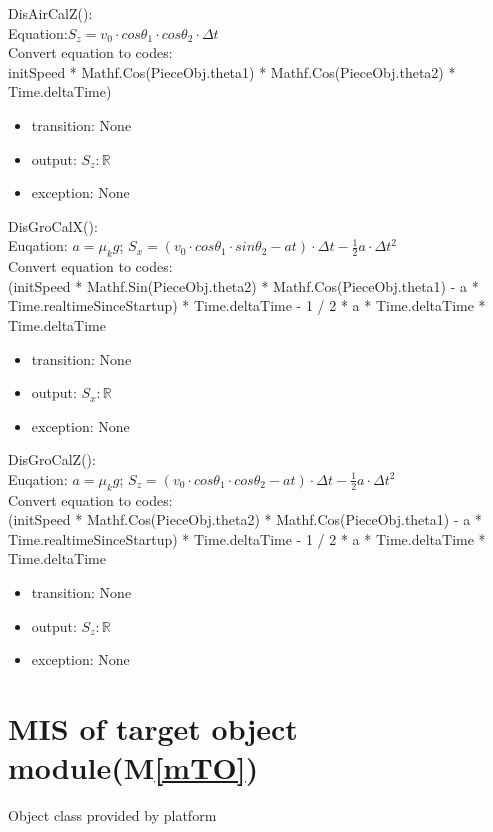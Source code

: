 \documentclass[12pt, titlepage]{article}
\newcommand{\mref}[1]{M\ref{#1}}
\begin{document}
\noindent DisAirCalZ():\\
Equation:$S_{z}=v_{0}\cdot cos\theta _{1}\cdot cos\theta _{2}\cdot \Delta t$\\
Convert equation to codes:\\
initSpeed * Mathf.Cos(PieceObj.theta1) * Mathf.Cos(PieceObj.theta2) * Time.deltaTime)
\begin{itemize}
	\item transition: None
	\item output: $S_{z}: \mathbb{R}$ 
	\item exception: None
\end{itemize}

\noindent DisGroCalX():\\
Euqation: $a=\mu_{k}g$; $S_{x}=(v_{0}\cdot cos\theta _{1}\cdot sin\theta _{2} - at)\cdot \Delta t-\frac{1}{2}a \cdot \Delta t^{2}$\\
Convert equation to codes:\\
(initSpeed * Mathf.Sin(PieceObj.theta2) * Mathf.Cos(PieceObj.theta1) - a * Time.realtimeSinceStartup) * Time.deltaTime - 1 / 2 * a * Time.deltaTime * Time.deltaTime
\begin{itemize}
	\item transition: None
	\item output: $S_{x}: \mathbb{R}$ 
	\item exception: None 
\end{itemize}

\noindent DisGroCalZ():\\
Euqation: $a=\mu_{k}g$; $S_{z}=(v_{0}\cdot cos\theta _{1}\cdot cos\theta _{2} - at)\cdot \Delta t-\frac{1}{2}a \cdot \Delta t^{2}$\\
Convert equation to codes:\\
(initSpeed * Mathf.Cos(PieceObj.theta2) * Mathf.Cos(PieceObj.theta1) - a * Time.realtimeSinceStartup) * Time.deltaTime - 1 / 2 * a * Time.deltaTime * Time.deltaTime
\begin{itemize}
	\item transition: None
	\item output: $S_{z}: \mathbb{R}$ 
	\item exception: None 
\end{itemize}

\section{MIS of target object module(\mref{mTO})}
\label{Sec_TOM}
Object class provided by platform
\end{document}
